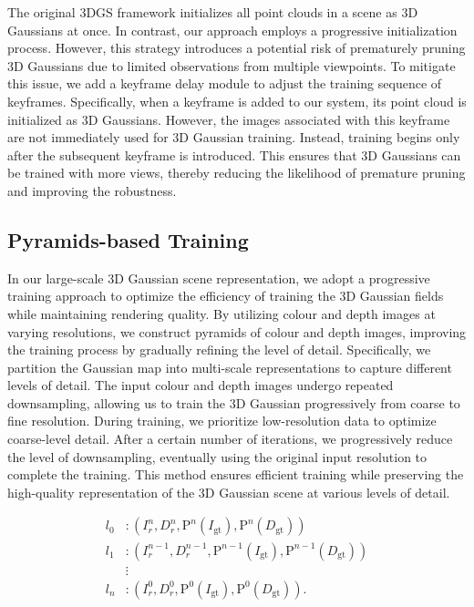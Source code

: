 \documentclass[lettersize,journal]{IEEEtran}
\begin{document}
The original 3DGS framework\cite{kerbl20233d} initializes all point clouds in a scene as 3D Gaussians at once. In contrast, our approach employs a progressive initialization process. However, this strategy introduces a potential risk of prematurely pruning 3D Gaussians due to limited observations from multiple viewpoints. To mitigate this issue, we add a keyframe delay module to adjust the training sequence of keyframes. Specifically, when a keyframe is added to our system, its point cloud is initialized as 3D Gaussians. However, the images associated with this keyframe are not immediately used for 3D Gaussian training. Instead, training begins only after the subsequent keyframe is introduced. This ensures that 3D Gaussians can be trained with more views, thereby reducing the likelihood of premature pruning and improving the robustness.

\subsection{Pyramids-based Training}
In our large-scale 3D Gaussian scene representation, we adopt a progressive training approach to optimize the efficiency of training the 3D Gaussian fields while maintaining rendering quality. By utilizing colour and depth images at varying resolutions, we construct pyramids of colour and depth images, improving the training process by gradually refining the level of detail. Specifically, we partition the Gaussian map into multi-scale representations to capture different levels of detail. The input colour and depth images undergo repeated downsampling, allowing us to train the 3D Gaussian progressively from coarse to fine resolution. During training, we prioritize low-resolution data to optimize coarse-level detail. After a certain number of iterations, we progressively reduce the level of downsampling, eventually using the original input resolution to complete the training. This method ensures efficient training while preserving the high-quality representation of the 3D Gaussian scene at various levels of detail.

\begin{equation}
\begin{aligned}
l_0 & :  \left( I_r^n, D_r^n , \mathrm{P}^n (I_\text{gt}), \mathrm{P}^n (D_\text{gt}) \right) \\
l_1 & : \left( I_r^{n-1}, D_r^{n-1}, \mathrm{P}^{n-1} (I_\text{gt}),\mathrm{P}^{n-1} (D_\text{gt}) \right) \\
& \vdots \\
l_n & : \left( I_r^0, D_r^0,  \mathrm{P}^0 (I_\text{gt}), \mathrm{P}^0 (D_\text{gt}) \right).
\end{aligned}
\end{equation}
\end{document}
